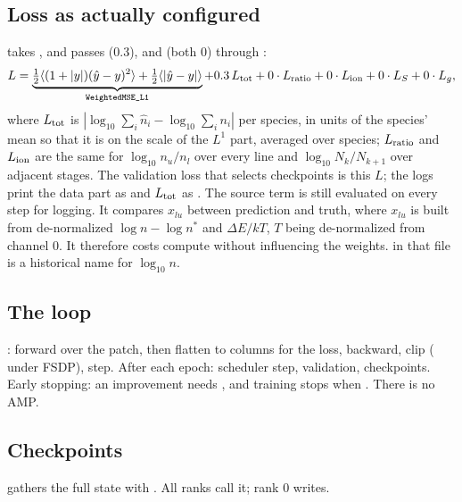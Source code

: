\subsection{Loss as actually configured}
 takes , and  passes  (0.3),  and  (both 0) through :
\begin{equation}
L=\underbrace{\tfrac12\langle(1+|y|)(\hat y-y)^2\rangle+\tfrac12\langle|\hat y-y|\rangle}_{\texttt{WeightedMSE\_L1}}+0.3\,L_{\rm tot}+0\cdot L_{\rm ratio}+0\cdot L_{\rm ion}+0\cdot L_S+0\cdot L_g ,
\end{equation}
where $L_{\rm tot}$ is $|\log_{10}\sum_i\hat n_i-\log_{10}\sum_in_i|$ per species, in units of the species' mean  so that it is on the scale of the $L^1$ part, averaged over species; $L_{\rm ratio}$ and $L_{\rm ion}$ are the same for $\log_{10}n_u/n_l$ over every line and $\log_{10}N_k/N_{k+1}$ over adjacent stages. The validation loss that selects checkpoints is this $L$; the logs print the data part as  and $L_{\rm tot}$ as .
The source term is still evaluated on every step for logging. It compares $x_{lu}$ between prediction and truth, where $x_{lu}$ is built from de-normalized $\log n-\log n^*$ and $\Delta E/kT$, $T$ being de-normalized from channel 0. It therefore costs compute without influencing the weights.  in that file is a historical name for $\log_{10}n$.

\subsection{The loop}
: forward over the patch, then flatten to columns  for the loss, backward, clip ( under FSDP), step. After each epoch: scheduler step, validation, checkpoints. Early stopping: an improvement needs , and training stops when . There is no AMP.

\subsection{Checkpoints}
 gathers the full state with . All ranks call it; rank 0 writes.

